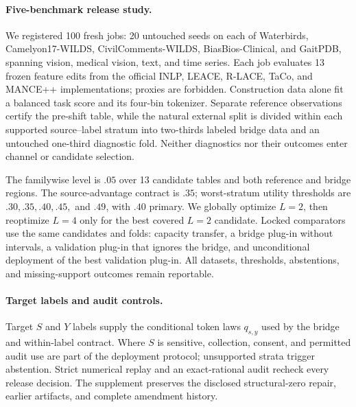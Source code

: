 \paragraph{Five-benchmark release study.}
We registered 100 fresh jobs: 20 untouched seeds on each of Waterbirds,
Camelyon17-WILDS, CivilComments-WILDS, BiasBios-Clinical, and GaitPDB, spanning
vision, medical vision, text, and time series. Each job evaluates 13 frozen
feature edits from the official INLP, LEACE, R-LACE, TaCo, and MANCE++
implementations; proxies are forbidden. Construction data alone fit a balanced
task score and its four-bin tokenizer. Separate reference observations certify
the pre-shift table, while the natural external split is divided within each
supported source--label stratum into two-thirds labeled bridge data and an
untouched one-third diagnostic fold. Neither diagnostics nor their outcomes
enter channel or candidate selection.

The familywise level is $.05$ over 13 candidate tables and both reference and
bridge regions. The source-advantage contract is $.35$; worst-stratum utility
thresholds are $.30,.35,.40,.45,$ and $.49$, with $.40$ primary. We globally
optimize $L=2$, then reoptimize $L=4$ only for the best covered $L=2$
candidate. Locked comparators use the same candidates and folds: capacity
transfer, a bridge
plug-in without intervals, a validation plug-in that ignores the bridge, and
unconditional deployment of the best validation plug-in. All datasets,
thresholds, abstentions, and missing-support outcomes remain reportable.

\paragraph{Target labels and audit controls.}
Target $S$ and $Y$ labels supply the conditional token laws $q_{s,y}$ used by
the bridge and within-label contract. Where $S$ is sensitive, collection,
consent, and permitted audit use are part of the deployment protocol;
unsupported strata trigger abstention. Strict numerical replay and an
exact-rational audit recheck every release decision. The supplement preserves
the disclosed structural-zero repair, earlier artifacts, and complete
amendment history.

